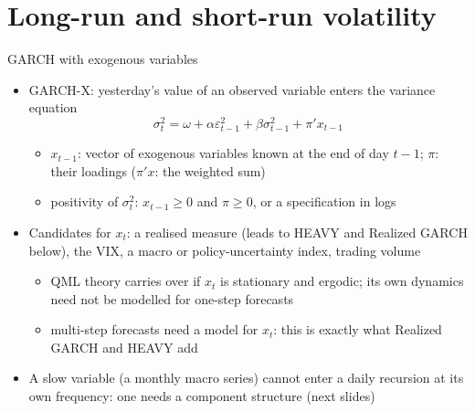 \section{Long-run and short-run volatility}

\begin{frame}{GARCH with exogenous variables}
\itemsize{\small}
\begin{itemize}
    \item GARCH-X: yesterday's value of an observed variable enters the variance equation
    \[ \sigma^2_t = \omega + \alpha\varepsilon^2_{t-1} + \beta\sigma^2_{t-1} + \pi'x_{t-1} \]
    \begin{itemize}
        \item $x_{t-1}$: vector of exogenous variables known at the end of day $t-1$; $\pi$: their loadings ($\pi'x$: the weighted sum)
        \item positivity of $\sigma^2_t$: $x_{t-1} \ge 0$ and $\pi \ge 0$, or a specification in logs
    \end{itemize}
    \item Candidates for $x_t$: a realised measure (leads to HEAVY and Realized GARCH below), the VIX, a macro or policy-uncertainty index, trading volume
    \begin{itemize}
        \item QML theory carries over if $x_t$ is stationary and ergodic; its own dynamics need not be modelled for one-step forecasts
        \item multi-step forecasts need a model for $x_t$: this is exactly what Realized GARCH and HEAVY add
    \end{itemize}
    \item A slow variable (a monthly macro series) cannot enter a daily recursion at its own frequency: one needs a component structure (next slides)
\end{itemize}
\end{frame}


